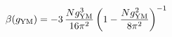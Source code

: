 \begin{equation} 
\label{betapert1} 
\beta(g_{\rm YM}) = - 3 \, \frac{N g_{\rm YM}^3}{16 \pi^2}  \left(1 -
\frac{N g_{\rm YM}^2}{8 \pi^2} \right)^{-1}
\end{equation} 
